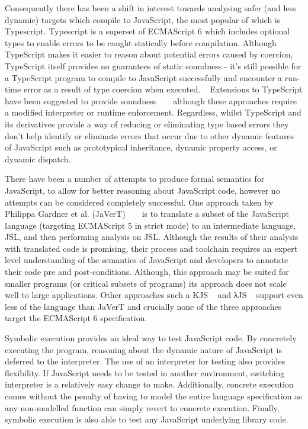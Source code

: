 \documentclass[]{final_report}
\begin{document}
Consequently there has been a shift in interest towards analysing safer (and less dynamic) targets which compile to JavaScript, the most popular of which is Typescript. Typescript is a superset of ECMAScript 6 which includes optional types to enable errors to be caught statically before compilation. Although TypeScript makes it easier to reason about potential errors caused by coercion, TypeScript itself provides no guarantees of static soundness - it's still possible for a TypeScript program to compile to JavaScript successfully and encounter a run-time error as a result of type coercion when executed. ~\cite{bierman2014understanding} Extensions to TypeScript have been suggested to provide soundness ~\cite{richards2015concrete} ~\cite{rastogi2015safe} although these approaches require a modified interpreter or runtime enforcement. Regardless, whilst TypeScript and its derivatives provide a way of reducing or eliminating type based errors they don't help identify or eliminate errors that occur due to other dynamic features of JavaScript such as prototypical inheritance, dynamic property access, or dynamic dispatch.

There have been a number of attempts to produce formal semantics for JavaScript, to allow for better reasoning about JavaScript code, however no attempts can be considered completely successful. One approach taken by Philippa Gardner et al. (JaVerT) ~\cite{gardner2012towards} ~\cite{guha2010essence} is to translate a subset of the JavaScript language (targeting ECMAScript 5 in strict mode) to an intermediate language, JSL, and then performing analysis on JSL. Although the results of their analysis with translated code is promising, their process and toolchain requires an expert level understanding of the semantics of JavaScript and developers to annotate their code pre and post-conditions. Although, this approach may be suited for smaller programs (or critical subsets of programs) its approach does not scale well to large applications. Other approaches such a KJS ~\cite{park2015kjs} and λJS ~\cite{guha2010essence} support even less of the language than JaVerT and crucially none of the three approaches target the ECMAScript 6 specification.

Symbolic execution provides an ideal way to test JavaScript code. By concretely executing the program, reasoning about the dynamic nature of JavaScript is deferred to the interpreter. The use of an interpreter for testing also provides flexibility. If JavaScript needs to be tested in another environment, switching interpreter is a relatively easy change to make. Additionally, concrete execution comes without the penalty of having to model the entire language specification as any non-modelled function can simply revert to concrete execution. Finally, symbolic execution is also able to test any JavaScript underlying library code.
\end{document}
